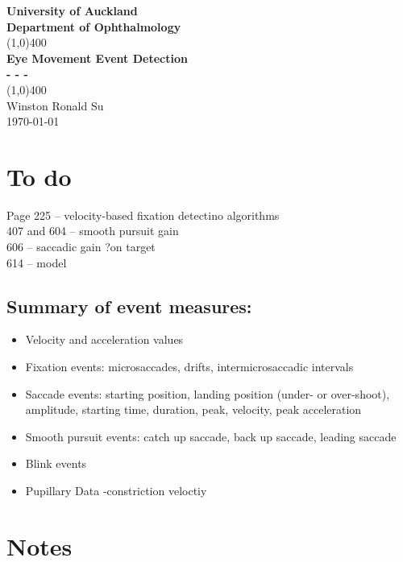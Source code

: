 \documentclass[12pt]{article}
\theoremstyle{definition}
\begin{document}
\begin{titlepage}
\begin{center}
\vspace*{1cm}
\Large{\textbf{University of Auckland}}\\
\Large{\textbf{Department of Ophthalmology}}\\
\vspace*{0.5cm}
\vfill
\line(1,0){400}\\
\huge{\textbf{Eye Movement Event Detection}}\\[3mm]
\Large{\textbf{- - - }}\\[1mm]
\line(1,0){400}\\
\vfill
Winston Ronald Su\\
\today\\

\end{center}
\end{titlepage}
\newpage
\section{To do}

Page 225 – velocity-based fixation detectino algorithms\\
407 and 604 – smooth pursuit gain\\
606 – saccadic gain ?on target\\
614 – model\\

\subsection{Summary of event measures:}
\begin{itemize}
\item Velocity and acceleration values
\item Fixation events:  microsaccades, drifts, intermicrosaccadic intervals
\item Saccade events: starting position, landing position (under- or over-shoot), amplitude, starting time, duration, peak, velocity, peak acceleration
\item Smooth pursuit events:  catch up saccade, back up saccade, leading saccade
\item Blink events
\item Pupillary Data -constriction veloctiy 
\end{itemize}


\newpage
\section{Notes}
\end{document}

